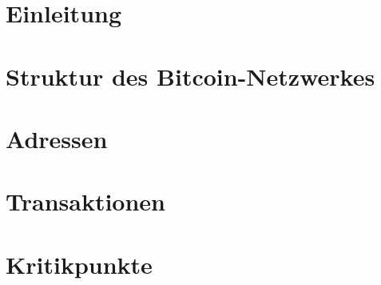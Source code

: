 \documentclass[12pt]{report}
\begin{document}


\tableofcontents

\chapter{Einleitung}


\chapter{Struktur des Bitcoin-Netzwerkes}


\chapter{Adressen}


\chapter{Transaktionen}


\chapter{Kritikpunkte}

\end{document}
